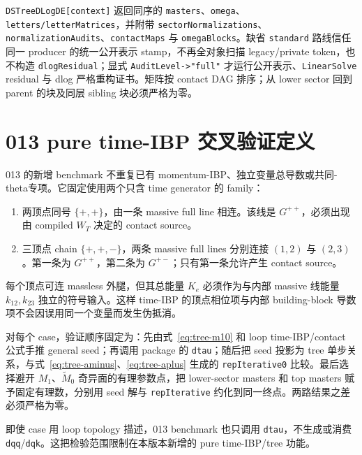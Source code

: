 ﻿\documentclass[a4paper,11pt]{article}
\begin{document}
\texttt{DSTreeDLogDE[context]} 返回同序的 \texttt{masters}、\texttt{omega}、\texttt{letters/letterMatrices}，并附带 \texttt{sectorNormalizations}、\texttt{normalizationAudits}、\texttt{contactMaps} 与 \texttt{omegaBlocks}。缺省 \texttt{standard} 路线信任同一 producer 的统一公开表示 stamp，不再全对象扫描 legacy/private token，也不构造 \texttt{dlogResidual}；显式 \texttt{AuditLevel->"full"} 才运行公开表示、\texttt{LinearSolve} residual 与 dlog 严格重构证书。矩阵按 contact DAG 排序；从 lower sector 回到 parent 的块及同层 sibling 块必须严格为零。

\section{013 pure time-IBP 交叉验证定义}

013 的新增 benchmark 不重复已有 momentum-IBP、独立变量总导数或共同-theta专项。它固定使用两个只含 time generator 的 family：
\begin{enumerate}
  \item 两顶点同号 $\{+,+\}$，由一条 massive full line 相连。该线是 $G^{++}$，必须出现由 compiled $W_T$ 决定的 contact source。
  \item 三顶点 chain $\{+,+,-\}$，两条 massive full lines 分别连接 $(1,2)$ 与 $(2,3)$。第一条为 $G^{++}$，第二条为 $G^{+-}$；只有第一条允许产生 contact source。
\end{enumerate}
每个顶点可连 massless 外腿，但其总能量 $K_e$ 必须作为与内部 massive 线能量 $k_{12},k_{23}$ 独立的符号输入。这样 time-IBP 的顶点相位项与内部 building-block 导数项不会因误用同一个变量而发生伪抵消。

对每个 case，验证顺序固定为：先由式~\eqref{eq:tree-m10} 和 loop time-IBP/contact 公式手推 general seed；再调用 package 的 \texttt{dtau}；随后把 seed 投影为 tree 单步关系，与式~\eqref{eq:tree-aminus}、\eqref{eq:tree-aplus} 生成的 \texttt{repIterative0} 比较。最后选择避开 $M_1$、$\widetilde M_0$ 奇异面的有理参数点，把 lower-sector masters 和 top masters 赋予固定有理数，分别用 seed 解与 \texttt{repIterative} 约化到同一终点。两路结果之差必须严格为零。

即使 case 用 loop topology 描述，013 benchmark 也只调用 \texttt{dtau}，不生成或消费 \texttt{dqq}/\texttt{dqk}。这把检验范围限制在本版本新增的 pure time-IBP/tree 功能。

\appendix

\end{document}
